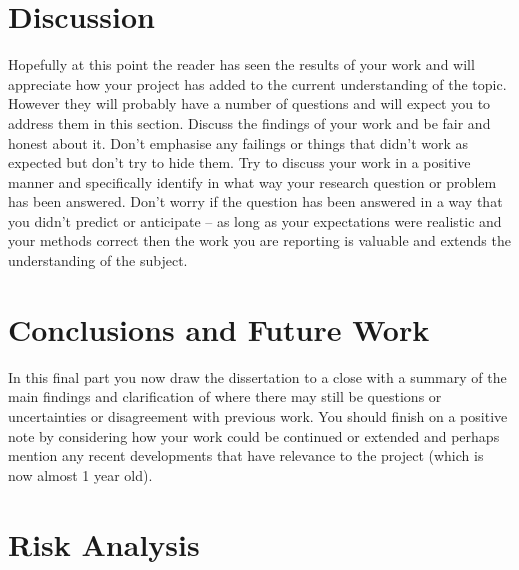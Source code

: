 \documentclass[a4paper, 12pt]{article}
\begin{document}
\section{Discussion} %
Hopefully at this point the reader has seen the results of your work and will appreciate how your project has added to the current understanding of the topic. However they will probably have a number of questions and will expect you to address them in this section. Discuss the findings of your work and be fair and honest about it. Don’t emphasise any failings or things that didn’t work as expected but don’t try to hide them. Try to discuss your work in a positive manner and specifically identify in what way your research question or problem has been answered. Don’t worry if the question has been answered in a way that you didn’t predict or anticipate – as long as your expectations were realistic and your methods correct then the work you are reporting is valuable and extends the understanding of the subject.

\pagebreak


\section{Conclusions and Future Work} %
In this final part you now draw the dissertation to a close with a summary of the main findings and clarification of where there may still be questions or uncertainties or disagreement with previous work. You should finish on a positive note by considering how your work could be continued or extended and perhaps mention any recent developments that have relevance to the project (which is now almost 1 year old).

\pagebreak


\section{Risk Analysis} %


\pagebreak



%
%
\end{document}
